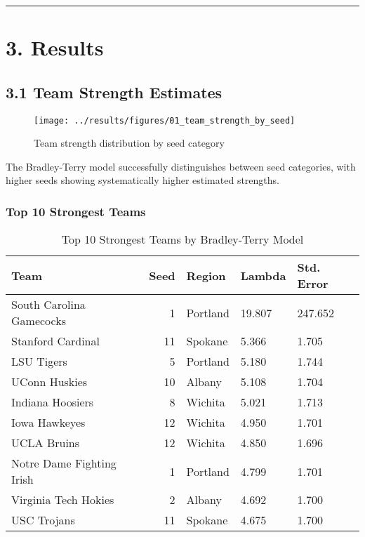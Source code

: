 \documentclass[
]{article}
\begin{document}
\begin{center}\rule{0.5\linewidth}{0.5pt}\end{center}

\section{3. Results}\label{results}

\subsection{3.1 Team Strength Estimates}\label{team-strength-estimates}

\begin{figure}

{\centering \texttt{[image: ../results/figures/01\_team\_strength\_by\_seed]} 

}

\caption{Team strength distribution by seed category}\label{fig:team-strength-plot}
\end{figure}

The Bradley-Terry model successfully distinguishes between seed
categories, with higher seeds showing systematically higher estimated
strengths.

\subsubsection{Top 10 Strongest Teams}\label{top-10-strongest-teams}

\begin{longtable}[t]{lrlll}
\caption{\label{tab:top-teams}Top 10 Strongest Teams by Bradley-Terry Model}\\
\toprule
Team & Seed & Region & Lambda & Std. Error\\
\midrule
South Carolina Gamecocks & 1 & Portland & 19.807 & 247.652\\
Stanford Cardinal & 11 & Spokane & 5.366 & 1.705\\
LSU Tigers & 5 & Portland & 5.180 & 1.744\\
UConn Huskies & 10 & Albany & 5.108 & 1.704\\
Indiana Hoosiers & 8 & Wichita & 5.021 & 1.713\\
\addlinespace
Iowa Hawkeyes & 12 & Wichita & 4.950 & 1.701\\
UCLA Bruins & 12 & Wichita & 4.850 & 1.696\\
Notre Dame Fighting Irish & 1 & Portland & 4.799 & 1.701\\
Virginia Tech Hokies & 2 & Albany & 4.692 & 1.700\\
USC Trojans & 11 & Spokane & 4.675 & 1.700\\
\bottomrule
\end{longtable}
\end{document}
